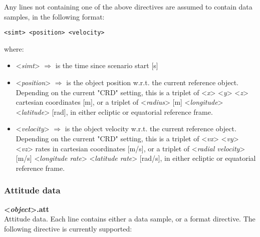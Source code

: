 \documentclass[Orbiter Technical Reference.tex]{subfiles}
\begin{document}
\noindent
Any lines not containing one of the above directives are assumed to contain data samples, in the following format:

\begin{lstlisting}[language=OSFS]
<simt> <position> <velocity>
\end{lstlisting}

\noindent
where:

\begin{itemize}
\item <\textit{simt}> $\Rightarrow$ is the time since scenario start [s]
\item <\textit{position}> $\Rightarrow$ is the object position w.r.t. the current reference object. Depending on the current "CRD" setting, this is a triplet of <\textit{x}> <\textit{y}> <\textit{z}> cartesian coordinates [m], or a triplet of <\textit{radius}> [m]  <\textit{longitude}> <\textit{latitude}> [rad], in either ecliptic or equatorial reference frame.
\item <\textit{velocity}> $\Rightarrow$ is the object velocity w.r.t. the current reference object. Depending on the current "CRD" setting, this is a triplet of <\textit{vx}> <\textit{vy}> <\textit{vz}> rates in cartesian coordinates [m/s], or a triplet of <\textit{radial velocity}> [m/s] <\textit{longitude rate}> <\textit{latitude rate}> [rad/s], in either ecliptic or equatorial reference frame.
\end{itemize}

\subsubsection{Attitude data}
\textbf{<\textit{object}>.att}\\
Attitude data. Each line contains either a data sample, or a format directive. The following directive is currently supported:
\end{document}
